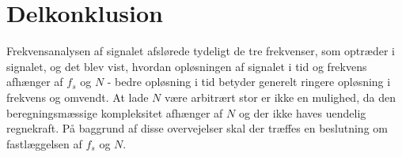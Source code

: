 \section{Delkonklusion}
Frekvensanalysen af signalet afslørede tydeligt de tre frekvenser, som optræder i signalet, og det blev vist, hvordan opløsningen af signalet i tid og frekvens afhænger af $f_s$ og $N$ - bedre opløsning i tid betyder generelt ringere opløsning i frekvens og omvendt. At lade $N$ være arbitrært stor er ikke en mulighed, da den beregningsmæssige kompleksitet afhænger af $N$ og der ikke haves uendelig regnekraft. På baggrund af disse overvejelser skal der træffes en beslutning om fastlæggelsen af $f_s$ og $N$.